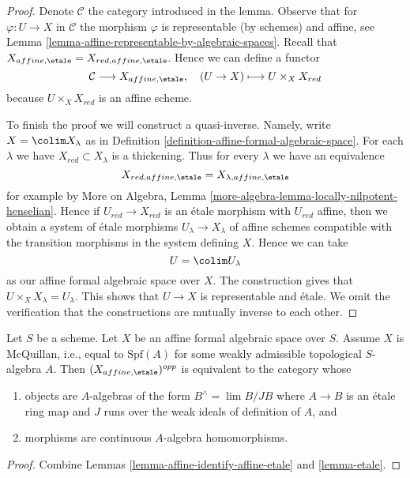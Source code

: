 \begin{proof}
Denote $\mathcal{C}$ the category introduced in the lemma.
Observe that for $\varphi : U \to X$ in $\mathcal{C}$ the
morphism $\varphi$ is representable (by schemes) and affine, see
Lemma \ref{lemma-affine-representable-by-algebraic-spaces}.
Recall that $X_{affine, \etale} = X_{red, affine, \etale}$.
Hence we can define a functor
$$
\mathcal{C} \longrightarrow X_{affine, \etale},\quad
(U \to X) \longmapsto U \times_X X_{red}
$$
because $U \times_X X_{red}$ is an affine scheme.

\medskip\noindent
To finish the proof we will construct a quasi-inverse.
Namely, write $X = \colim X_\lambda$ as in
Definition \ref{definition-affine-formal-algebraic-space}.
For each $\lambda$ we have $X_{red} \subset X_\lambda$
is a thickening. Thus for every $\lambda$ we have an
equivalence
$$
X_{red, affine, \etale} = X_{\lambda, affine, \etale}
$$
for example by
More on Algebra, Lemma \ref{more-algebra-lemma-locally-nilpotent-henselian}.
Hence if $U_{red} \to X_{red}$ is an \'etale morphism with
$U_{red}$ affine, then we obtain a system of \'etale morphisms
$U_\lambda \to X_\lambda$ of affine schemes compatible with the
transition morphisms in the system defining $X$. Hence we can take
$$
U = \colim U_\lambda
$$
as our affine formal algebraic space over $X$. The construction gives that
$U \times_X X_\lambda = U_\lambda$. This shows that $U \to X$ is
representable and \'etale. We omit the verification that the constructions
are mutually inverse to each other.
\end{proof}

\begin{lemma}
\label{lemma-affine-etale-mcquillan}
Let $S$ be a scheme. Let $X$ be an affine formal
algebraic space over $S$. Assume $X$ is McQuillan, i.e.,
equal to $\text{Spf}(A)$ for some
weakly admissible topological $S$-algebra $A$.
Then $(X_{affine, \etale})^{opp}$ is equivalent to
the category whose
\begin{enumerate}
\item objects are $A$-algebras of the form
$B^\wedge = \lim B/JB$ where $A \to B$ is an \'etale ring map
and $J$ runs over the weak ideals of definition of $A$, and
\item morphisms are continuous $A$-algebra homomorphisms.
\end{enumerate}
\end{lemma}

\begin{proof}
Combine Lemmas \ref{lemma-affine-identify-affine-etale} and \ref{lemma-etale}.
\end{proof}

